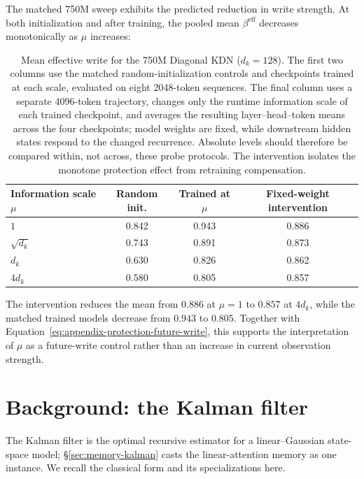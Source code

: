 \documentclass{article} %
\begin{document}
The matched 750M sweep exhibits the predicted reduction in write strength. At both initialization
and after training, the pooled mean $\beta^{\mathrm{eff}}$ decreases monotonically as $\mu$
increases:
\begin{table}[H]
  \centering
  \small
  \setlength{\tabcolsep}{8pt}
  \begin{tabular}{@{}lccc@{}}
    \toprule
    Information scale $\mu$ & Random init. & Trained at $\mu$ & Fixed-weight intervention \\
    \midrule
    $1$          & 0.842 & 0.943 & 0.886 \\
    $\sqrt{d_k}$ & 0.743 & 0.891 & 0.873 \\
    $d_k$        & 0.630 & 0.826 & 0.862 \\
    $4d_k$       & 0.580 & 0.805 & 0.857 \\
    \bottomrule
  \end{tabular}
  \caption{Mean effective write for the 750M Diagonal KDN ($d_k=128$). The first two columns use
  the matched random-initialization controls and checkpoints trained at each scale, evaluated on
  eight 2048-token sequences. The final column uses a separate 4096-token trajectory, changes only
  the runtime information scale of each trained checkpoint, and averages the resulting
  layer--head--token means across the four checkpoints; model weights are fixed, while downstream
  hidden states respond to the changed recurrence. Absolute levels should therefore be compared
  within, not across, these probe protocols. The intervention isolates the monotone protection
  effect from retraining compensation.}
  \label{tab:appendix-effective-write-scale}
\end{table}
The intervention reduces the mean from $0.886$ at $\mu=1$ to $0.857$ at $4d_k$, while the
matched trained models decrease from $0.943$ to $0.805$. Together with
Equation~\eqref{eq:appendix-protection-future-write}, this supports the interpretation of $\mu$ as
a future-write control rather than an increase in current observation strength.

\FloatBarrier

\iffalse
\section{Background: the Kalman filter}
\label{app:kalman}

The Kalman filter is the optimal recursive estimator for a linear--Gaussian
state-space model; \S\ref{sec:memory-kalman} casts the linear-attention memory as one
instance. We recall the classical form and its specializations here.
\end{document}

